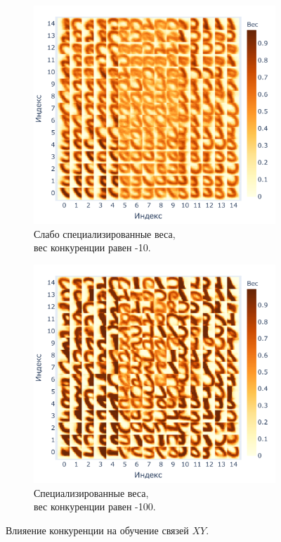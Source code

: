 \documentclass[a4paper]{article}
\begin{document}
\begin{figure}[H]
\centering
\begin{subfigure}{0.45\textwidth}
    \includegraphics[width=\textwidth,keepaspectratio=true]{weights_XY_bad_ru.pdf}
    \caption{Слабо специализированные веса,\\ вес конкуренции равен -10.}
\end{subfigure}
\begin{subfigure}{0.45\textwidth}
    \includegraphics[width=\textwidth,keepaspectratio=true]{weights_XY_good_ru.pdf}
    \caption{Специализированные веса,\\ вес конкуренции равен -100.}
\end{subfigure}
\caption{Влияение конкуренции на обучение связей $XY$.}
\label{competition-training-importance}
\end{figure}
\end{document}
